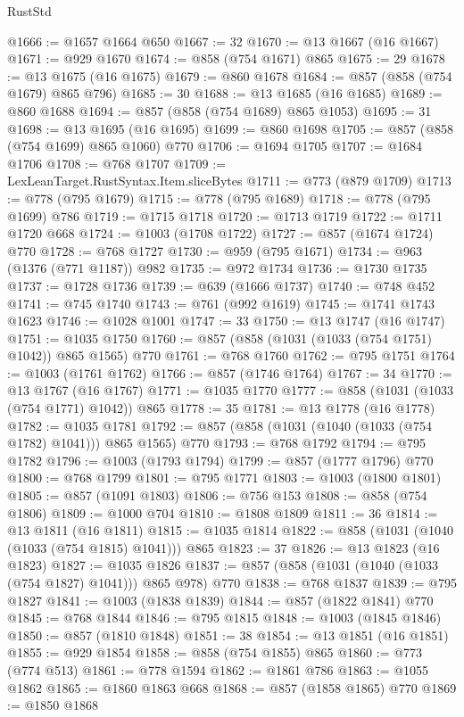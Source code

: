 \begin{lexlean}{RustStd}
\begin{coremodule}
@1666 := @1657 @1664 @650
@1667 := 32
@1670 := @13 @1667 (@16 @1667)
@1671 := @929 @1670
@1674 := @858 (@754 @1671) @865
@1675 := 29
@1678 := @13 @1675 (@16 @1675)
@1679 := @860 @1678
@1684 := @857 (@858 (@754 @1679) @865 @796)
@1685 := 30
@1688 := @13 @1685 (@16 @1685)
@1689 := @860 @1688
@1694 := @857 (@858 (@754 @1689) @865 @1053)
@1695 := 31
@1698 := @13 @1695 (@16 @1695)
@1699 := @860 @1698
@1705 := @857 (@858 (@754 @1699) @865 @1060) @770
@1706 := @1694 @1705
@1707 := @1684 @1706
@1708 := @768 @1707
@1709 := LexLeanTarget.RustSyntax.Item.sliceBytes
@1711 := @773 (@879 @1709)
@1713 := @778 (@795 @1679)
@1715 := @778 (@795 @1689)
@1718 := @778 (@795 @1699) @786
@1719 := @1715 @1718
@1720 := @1713 @1719
@1722 := @1711 @1720 @668
@1724 := @1003 (@1708 @1722)
@1727 := @857 (@1674 @1724) @770
@1728 := @768 @1727
@1730 := @959 (@795 @1671)
@1734 := @963 (@1376 (@771 @1187)) @982
@1735 := @972 @1734
@1736 := @1730 @1735
@1737 := @1728 @1736
@1739 := @639 (@1666 @1737)
@1740 := @748 @452
@1741 := @745 @1740
@1743 := @761 (@992 @1619)
@1745 := @1741 @1743 @1623
@1746 := @1028 @1001
@1747 := 33
@1750 := @13 @1747 (@16 @1747)
@1751 := @1035 @1750
@1760 := @857 (@858 (@1031 (@1033 (@754 @1751) @1042)) @865 @1565) @770
@1761 := @768 @1760
@1762 := @795 @1751
@1764 := @1003 (@1761 @1762)
@1766 := @857 (@1746 @1764)
@1767 := 34
@1770 := @13 @1767 (@16 @1767)
@1771 := @1035 @1770
@1777 := @858 (@1031 (@1033 (@754 @1771) @1042)) @865
@1778 := 35
@1781 := @13 @1778 (@16 @1778)
@1782 := @1035 @1781
@1792 := @857 (@858 (@1031 (@1040 (@1033 (@754 @1782) @1041))) @865 @1565) @770
@1793 := @768 @1792
@1794 := @795 @1782
@1796 := @1003 (@1793 @1794)
@1799 := @857 (@1777 @1796) @770
@1800 := @768 @1799
@1801 := @795 @1771
@1803 := @1003 (@1800 @1801)
@1805 := @857 (@1091 @1803)
@1806 := @756 @153
@1808 := @858 (@754 @1806)
@1809 := @1000 @704
@1810 := @1808 @1809
@1811 := 36
@1814 := @13 @1811 (@16 @1811)
@1815 := @1035 @1814
@1822 := @858 (@1031 (@1040 (@1033 (@754 @1815) @1041))) @865
@1823 := 37
@1826 := @13 @1823 (@16 @1823)
@1827 := @1035 @1826
@1837 := @857 (@858 (@1031 (@1040 (@1033 (@754 @1827) @1041))) @865 @978) @770
@1838 := @768 @1837
@1839 := @795 @1827
@1841 := @1003 (@1838 @1839)
@1844 := @857 (@1822 @1841) @770
@1845 := @768 @1844
@1846 := @795 @1815
@1848 := @1003 (@1845 @1846)
@1850 := @857 (@1810 @1848)
@1851 := 38
@1854 := @13 @1851 (@16 @1851)
@1855 := @929 @1854
@1858 := @858 (@754 @1855) @865
@1860 := @773 (@774 @513)
@1861 := @778 @1594
@1862 := @1861 @786
@1863 := @1055 @1862
@1865 := @1860 @1863 @668
@1868 := @857 (@1858 @1865) @770
@1869 := @1850 @1868

\end{coremodule}
\end{lexlean}
